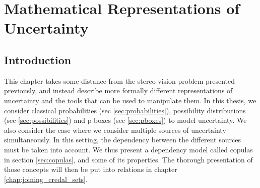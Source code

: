 \chapter{Mathematical Representations of Uncertainty}\label{chap:representation_of_uncertainty}

\section{Introduction}
This chapter takes some distance from the stereo vision problem presented previously, and instead describe more formally different representations of uncertainty and the tools that can be used to manipulate them. In this thesis, we consider classical probabilities (sec \ref{sec:probabilities}), possibility distributions (sec \ref{sec:possibilities}) and p-boxes (sec \ref{sec:pboxes}) to model uncertainty. We also consider the case where we consider multiple sources of uncertainty simultaneously. In this setting, the dependency between the different sources must be taken into account. We thus present a dependency model called copulas in section \ref{sec:copulas}, and some of its properties. The thorough presentation of those concepts will then be put into relations in chapter \ref{chap:joining_credal_sets}. 

